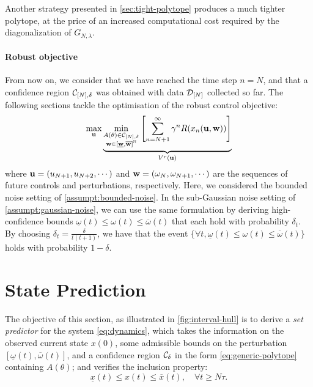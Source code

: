 \documentclass{article}
\begin{document}
Another strategy presented in \autoref{sec:tight-polytope} produces a much tighter polytope, at the price of an increased computational cost required by the diagonalization of $G_{N,\lambda}$.

\paragraph{Robust objective}

From now on, we consider that we have reached the time step $n=N$, and that a confidence region $\mathcal{C}_{[N],\delta}$ was obtained with data $\mathcal{D}_{[N]}$ collected so far. The following sections tackle the optimisation of the robust control objective:
\begin{equation}
\label{eq:robust-control}
\max_{\mathbf{u}} \underbrace{\min_{\substack{A(\theta) \in \mathcal{C}_{[N],\delta} \\ \mathbf{w}\in[\underline{\mathbf{w}},\overline{\mathbf{w}}]^{\mathbb{N}}}} \left[\sum_{n=N+1}^\infty \gamma^n R(x_n(\mathbf{u},\mathbf{w}))\right]}_{V^r(\mathbf{u})}
\end{equation}
where $\mathbf{u} = (u_{N+1},u_{N+2},\cdots)$ and $\mathbf{w} = (\omega_N, \omega_{N+1},\cdots)$ are the sequences of future controls and perturbations, respectively. Here, we considered the bounded noise setting of \autoref{assumpt:bounded-noise}. In the sub-Gaussian noise setting of \autoref{assumpt:gaussian-noise}, we can use the same formulation by deriving high-confidence bounds $\underline{\omega}(t) \leq \omega(t) \leq \overline{\omega}(t)$ that each hold with probability $\delta_t$. By choosing $\delta_t = \frac{\delta}{t(t+1)}$, we have that the event $\{\forall t, \underline{\omega}(t) \leq \omega(t) \leq \overline{\omega}(t)\}$ holds with probability $1-\delta$.


\section{State Prediction}

\label{sec:prediction}

The objective of this section, as illustrated in \autoref{fig:interval-hull} is to  derive a \emph{set predictor} for the system \eqref{eq:dynamics}, which takes the information on the observed current state ${x}({0})$, some admissible bounds on the perturbation $[\underline{\omega}(t),\overline{\omega}(t)]$, and a confidence region $\mathcal{C}_\delta$ in the form \eqref{eq:generic-polytope} containing $A(\theta)$; and verifies the inclusion property:
\begin{equation}
\label{eq:interval_property}
\underline{x}(t)\leq x(t)\leq\overline{x}(t),\quad\forall t\geq N\tau.
\end{equation}
\end{document}
